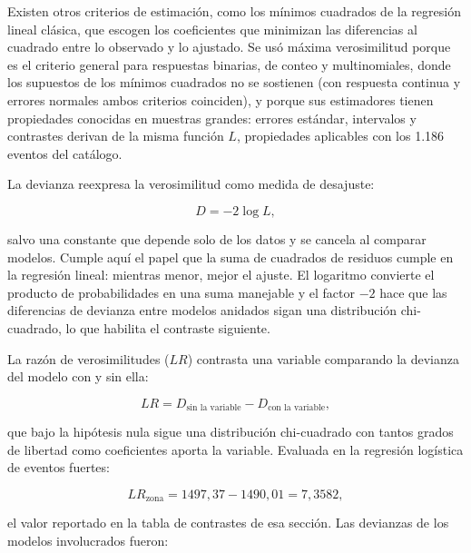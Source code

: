 \documentclass[
  spanish,
  letterpaper,
  DIV=11,
  numbers=noendperiod]{scrartcl}
\begin{document}
Existen otros criterios de estimación, como los mínimos cuadrados de la
regresión lineal clásica, que escogen los coeficientes que minimizan las
diferencias al cuadrado entre lo observado y lo ajustado. Se usó máxima
verosimilitud porque es el criterio general para respuestas binarias, de
conteo y multinomiales, donde los supuestos de los mínimos cuadrados no
se sostienen (con respuesta continua y errores normales ambos criterios
coinciden), y porque sus estimadores tienen propiedades conocidas en
muestras grandes: errores estándar, intervalos y contrastes derivan de
la misma función \(L\), propiedades aplicables con los 1.186 eventos del
catálogo.

La devianza reexpresa la verosimilitud como medida de desajuste:

\[
D=-2\log L,
\]

salvo una constante que depende solo de los datos y se cancela al
comparar modelos. Cumple aquí el papel que la suma de cuadrados de
residuos cumple en la regresión lineal: mientras menor, mejor el ajuste.
El logaritmo convierte el producto de probabilidades en una suma
manejable y el factor \(-2\) hace que las diferencias de devianza entre
modelos anidados sigan una distribución chi-cuadrado, lo que habilita el
contraste siguiente.

La razón de verosimilitudes (\(LR\)) contrasta una variable comparando
la devianza del modelo con y sin ella:

\[
LR = D_{\text{sin la variable}} - D_{\text{con la variable}},
\]

que bajo la hipótesis nula sigue una distribución chi-cuadrado con
tantos grados de libertad como coeficientes aporta la variable. Evaluada
en la regresión logística de eventos fuertes:

\[
LR_{\text{zona}} = 1497{,}37 - 1490{,}01 = 7{,}3582,
\]

el valor reportado en la tabla de contrastes de esa sección. Las
devianzas de los modelos involucrados fueron:
\end{document}
